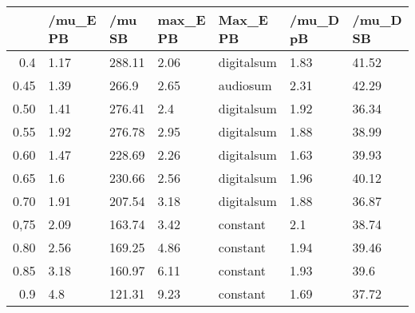 \begin{table}[ht]
\centering
\begin{tabular}{rllllll}
  \hline
 & /mu\_E PB & /mu SB & max\_E PB & Max\_E PB & /mu\_D pB & /mu\_D SB \\ 
  \hline
0.4 & 1.17 & 288.11 & 2.06 & digitalsum & 1.83 & 41.52 \\ 
  0.45 & 1.39 & 266.9 & 2.65 & audiosum & 2.31 & 42.29 \\ 
  0.50 & 1.41 & 276.41 & 2.4 & digitalsum & 1.92 & 36.34 \\ 
  0.55 & 1.92 & 276.78 & 2.95 & digitalsum & 1.88 & 38.99 \\ 
  0.60 & 1.47 & 228.69 & 2.26 & digitalsum & 1.63 & 39.93 \\ 
  0.65 & 1.6 & 230.66 & 2.56 & digitalsum & 1.96 & 40.12 \\ 
  0.70 & 1.91 & 207.54 & 3.18 & digitalsum & 1.88 & 36.87 \\ 
  0,75 & 2.09 & 163.74 & 3.42 & constant & 2.1 & 38.74 \\ 
  0.80 & 2.56 & 169.25 & 4.86 & constant & 1.94 & 39.46 \\ 
  0.85 & 3.18 & 160.97 & 6.11 & constant & 1.93 & 39.6 \\ 
  0.9 & 4.8 & 121.31 & 9.23 & constant & 1.69 & 37.72 \\ 
   \hline
\end{tabular}
\end{table}
